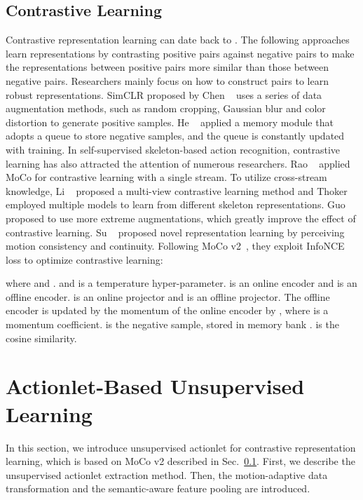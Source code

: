 \documentclass[twocolumn]{article}
\begin{document}
\subsection{Contrastive Learning}
\label{sec:contra}
Contrastive representation learning can date back to \cite{hadsell2006dimensionality}. The following approaches~\cite{tian2019contrastive,wu2018unsupervised,bachman2019learning,ye2019unsupervised,isola2015learning} learn representations by contrasting positive pairs against negative pairs to make the representations between positive pairs more similar than those between negative pairs. Researchers mainly focus on how to construct pairs to learn robust representations. SimCLR proposed by Chen \etal~\cite{chen2020simple} uses a series of data augmentation methods, such as random cropping, Gaussian blur and color distortion to generate positive samples. He \etal~\cite{he2020momentum} applied a memory module that adopts a queue to store negative samples, and the queue is constantly updated with training. In self-supervised skeleton-based action recognition, contrastive learning has also attracted the attention of numerous researchers. Rao \etal~\cite{rao2021augmented} applied MoCo for contrastive learning with a single stream. To utilize cross-stream knowledge, Li \etal~\cite{li20213d} proposed a multi-view contrastive learning method and Thoker \etal~\cite{thoker2021skeleton} employed multiple models to learn from different skeleton representations. Guo \etal~\cite{guo2021contrastive} proposed to use more extreme augmentations, which greatly improve the effect of contrastive learning. Su \etal~\cite{su2021self} proposed novel representation learning by perceiving motion consistency and continuity. 
Following MoCo v2~\cite{he2020momentum}, they exploit InfoNCE loss to optimize contrastive learning:

where  and .  and  is a temperature hyper-parameter.  is an online encoder and  is an offline encoder.  is an online projector and  is an offline projector. The offline encoder  is updated by the momentum of the online encoder  by , where  is a momentum coefficient.  is the negative sample, stored in memory bank .  is the cosine similarity.

\section{Actionlet-Based Unsupervised Learning}
In this section, we introduce unsupervised actionlet for contrastive representation learning, which is based on MoCo v2 described in Sec.~\ref{sec:contra}.
First, we describe the unsupervised actionlet extraction method. Then, the motion-adaptive data transformation and the semantic-aware feature pooling are introduced.
\end{document}
